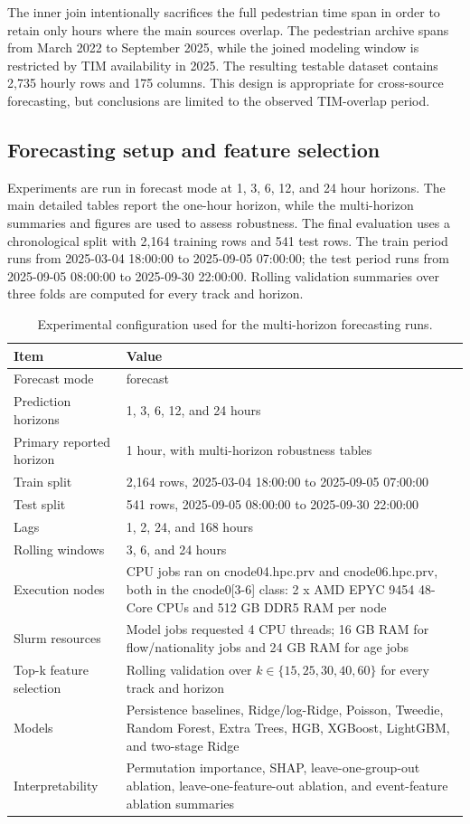 The inner join intentionally sacrifices the full pedestrian time span in order to
retain only hours where the main sources overlap. The pedestrian archive spans
from March 2022 to September 2025, while the joined modeling window is
restricted by TIM availability in 2025. The resulting testable dataset contains
2,735 hourly rows and 175 columns. This design is appropriate for cross-source
forecasting, but conclusions are limited to the observed TIM-overlap period.

\subsection{Forecasting setup and feature selection}

Experiments are run in forecast mode at 1, 3, 6, 12, and 24 hour horizons. The
main detailed tables report the one-hour horizon, while the multi-horizon
summaries and figures are used to assess robustness. The final evaluation uses a
chronological split with 2,164 training rows and 541 test rows. The train period
runs from 2025-03-04 18:00:00 to 2025-09-05 07:00:00; the test period runs from
2025-09-05 08:00:00 to 2025-09-30 22:00:00. Rolling validation summaries over
three folds are computed for every track and horizon.

\begin{table}
\caption{Experimental configuration used for the multi-horizon forecasting runs.}
\label{tab:setup}
\centering
\begin{tabularx}{\textwidth}{lX}
\toprule
Item & Value \\
\midrule
Forecast mode & forecast \\
Prediction horizons & 1, 3, 6, 12, and 24 hours \\
Primary reported horizon & 1 hour, with multi-horizon robustness tables \\
Train split & 2,164 rows, 2025-03-04 18:00:00 to 2025-09-05 07:00:00 \\
Test split & 541 rows, 2025-09-05 08:00:00 to 2025-09-30 22:00:00 \\
Lags & 1, 2, 24, and 168 hours \\
Rolling windows & 3, 6, and 24 hours \\
Execution nodes & CPU jobs ran on cnode04.hpc.prv and cnode06.hpc.prv, both in the cnode0[3-6] class: 2 x AMD EPYC 9454 48-Core CPUs and 512 GB DDR5 RAM per node \\
Slurm resources & Model jobs requested 4 CPU threads; 16 GB RAM for flow/nationality jobs and 24 GB RAM for age jobs \\
Top-k feature selection & Rolling validation over $k \in \{15,25,30,40,60\}$ for every track and horizon \\
Models & Persistence baselines, Ridge/log-Ridge, Poisson, Tweedie, Random Forest, Extra Trees, HGB, XGBoost, LightGBM, and two-stage Ridge \\
Interpretability & Permutation importance, SHAP, leave-one-group-out ablation, leave-one-feature-out ablation, and event-feature ablation summaries \\
\bottomrule
\end{tabularx}
\end{table}

